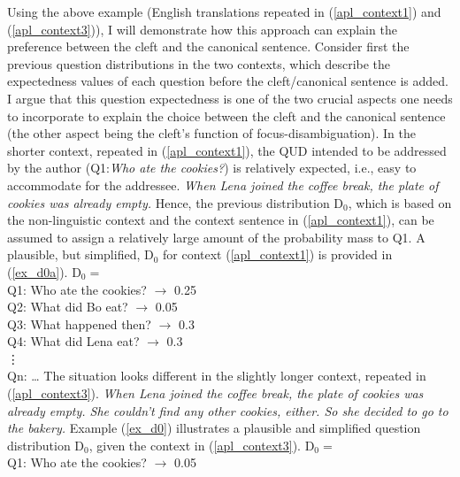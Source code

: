 \documentclass[output=paper,colorlinks,citecolor=brown]{langscibook}
\begin{document}
Using the above example (English translations repeated in (\ref{apl_context1}) and (\ref{apl_context3})), I will demonstrate how this approach can explain the preference between the cleft and the canonical sentence. Consider first the previous question distributions in the two contexts, which describe the expectedness values of each question before the cleft/canonical sentence is added. I argue that this question expectedness is one of the two crucial aspects one needs to incorporate to explain the choice between the cleft and the canonical sentence (the other aspect being the cleft's function of focus-disambiguation). In the shorter context, repeated in (\ref{apl_context1}), the QUD intended to be addressed by the author (Q1:\textit{Who ate the cookies?}) is relatively expected, i.e., easy to accommodate for the addressee.
\ea\label{apl_context1} \textit{When Lena joined the coffee break, the plate of cookies was already empty.}
\z
\z
Hence, the previous distribution D$_{0}$, which is based on the non-linguistic context and the context sentence in (\ref{apl_context1}), can be assumed to assign a relatively large amount of the probability mass to Q1. A plausible, but simplified, D$_{0}$ for context (\ref{apl_context1}) is provided in (\ref{ex_d0a}).
    \ea\label{ex_d0a}D$_{0}=$\\
Q1: Who ate the cookies? $\rightarrow$ 0.25\\
Q2: What did Bo eat? $\rightarrow$ 0.05\\
Q3: What happened then? $\rightarrow$ 0.3\\
Q4: What did Lena eat? $\rightarrow$ 0.3\\
\hspace{3ex}\vdots\\
Qn: \dots
\z
%
The situation looks different in the slightly longer context, repeated in (\ref{apl_context3}). 
\ea\label{apl_context3} \textit{When Lena joined the coffee break, the plate of cookies was already empty. She couldn't find any other cookies, either. So she decided to go to the bakery.}
\label{apl_context3a}
\z
\z
Example (\ref{ex_d0}) illustrates a plausible and simplified question distribution D$_{0}$, given the context in (\ref{apl_context3}).
       \ea\label{ex_d0}D$_{0}=$\\
Q1: Who ate the cookies? $\rightarrow$ 0.05\\
\end{document}
